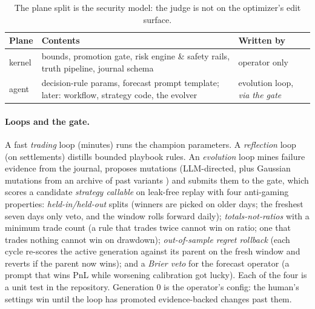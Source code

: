 \documentclass[sigconf,review,anonymous]{acmart}
\begin{document}
\begin{table}[t]
\centering
\small
\begin{tabular}{@{}p{1.3cm}p{4.2cm}p{1.7cm}@{}}
\toprule
\textbf{Plane} & \textbf{Contents} & \textbf{Written by} \\
\midrule
kernel & bounds, promotion gate, risk engine \& safety rails, truth pipeline, journal schema & operator only \\
agent & decision-rule params, forecast prompt template; later: workflow, strategy code, the evolver & evolution loop, \emph{via the gate} \\
\bottomrule
\end{tabular}
\caption{The plane split is the security model: the judge is not on the
optimizer's edit surface.}
\label{tab:planes}
\end{table}

\paragraph{Loops and the gate.} A fast \emph{trading} loop (minutes) runs the
champion parameters. A \emph{reflection} loop (on settlements) distills bounded
playbook rules. An \emph{evolution} loop mines failure evidence from the
journal, proposes mutations (LLM-directed, plus Gaussian mutations from an
archive of past variants \cite{dgm}) and submits them to the gate, which scores
a candidate \emph{strategy callable} on leak-free replay with four anti-gaming
properties: \emph{held-in/held-out} splits (winners are picked on older days;
the freshest seven days only veto, and the window rolls forward daily);
\emph{totals-not-ratios} with a minimum trade count (a rule that trades twice
cannot win on ratio; one that trades nothing cannot win on drawdown);
\emph{out-of-sample regret rollback} (each cycle re-scores the active generation
against its parent on the fresh window and reverts if the parent now wins); and
a \emph{Brier veto} for the forecast operator (a prompt that wins PnL while
worsening calibration got lucky). Each of the four is a unit test in the
repository. Generation 0 is the operator's config: the human's settings win
until the loop has promoted evidence-backed changes past them.
\end{document}
